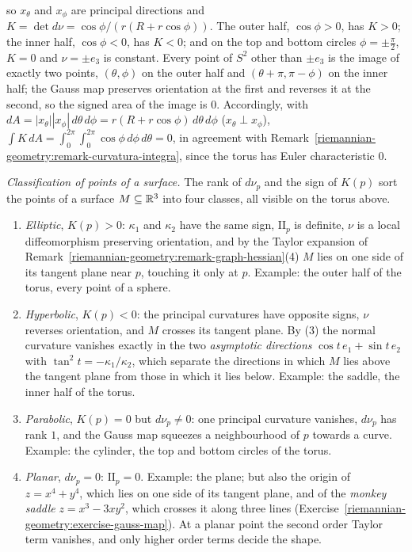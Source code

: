 \begin{example}
\begin{enumerate}
\[\]
so $x_\theta$ and $x_\phi$ are principal directions and $K = \det d\nu = \cos\phi/(r(R + r\cos\phi))$. The outer half, $\cos\phi > 0$, has $K > 0$; the inner half, $\cos\phi < 0$, has $K < 0$; and on the top
and bottom circles $\phi = \pm\frac\pi2$, $K = 0$ and $\nu = \pm e_3$ is constant. Every point of $S^2$ other than $\pm e_3$ is the image of exactly two points, $(\theta, \phi)$ on the outer half and
$(\theta + \pi, \pi - \phi)$ on the inner half; the Gauss map preserves orientation at the first and reverses it at the second, so the signed area of the image is $0$. Accordingly, with
$dA = |x_\theta||x_\phi|\,d\theta\,d\phi = r(R + r\cos\phi)\,d\theta\,d\phi$ ($x_\theta \perp x_\phi$),
$\int K\,dA = \int_0^{2\pi}\!\int_0^{2\pi}\cos\phi\,d\phi\,d\theta = 0$, in agreement with Remark~\ref{riemannian-geometry:remark-curvatura-integra}, since the torus has Euler characteristic $0$.
\end{enumerate}
\end{example}

\begin{remark}\label{riemannian-geometry:remark-gauss-map-points}
\emph{Classification of points of a surface.} The rank of $d\nu_p$ and the sign of $K(p)$ sort the points of a surface $M \subseteq \mathbb{R}^3$ into four classes, all visible on the torus above.
\begin{enumerate}
\item \emph{Elliptic}, $K(p) > 0$: $\kappa_1$ and $\kappa_2$ have the same sign, $\mathrm{II}_p$ is definite, $\nu$ is a local diffeomorphism preserving orientation, and by the Taylor expansion of
Remark~\ref{riemannian-geometry:remark-graph-hessian}(4) $M$ lies on one side of its tangent plane near $p$, touching it only at $p$. Example: the outer half of the torus, every point of a sphere.
\item \emph{Hyperbolic}, $K(p) < 0$: the principal curvatures have opposite signs, $\nu$ reverses orientation, and $M$ crosses its tangent plane. By (3) the normal curvature vanishes exactly in the two
\emph{asymptotic directions} $\cos t\,e_1 + \sin t\,e_2$ with $\tan^2t = -\kappa_1/\kappa_2$, which separate the directions in which $M$ lies above the tangent plane from those in which it lies below.
Example: the saddle, the inner half of the torus.
\item \emph{Parabolic}, $K(p) = 0$ but $d\nu_p \neq 0$: one principal curvature vanishes, $d\nu_p$ has rank $1$, and the Gauss map squeezes a neighbourhood of $p$ towards a curve. Example: the cylinder, the
top and bottom circles of the torus.
\item \emph{Planar}, $d\nu_p = 0$: $\mathrm{II}_p = 0$. Example: the plane; but also the origin of $z = x^4 + y^4$, which lies on one side of its tangent plane, and of the \emph{monkey saddle}
$z = x^3 - 3xy^2$, which crosses it along three lines (Exercise~\ref{riemannian-geometry:exercise-gauss-map}). At a planar point the second order Taylor term vanishes, and only higher order terms decide the
shape.
\end{enumerate}
\end{remark}

